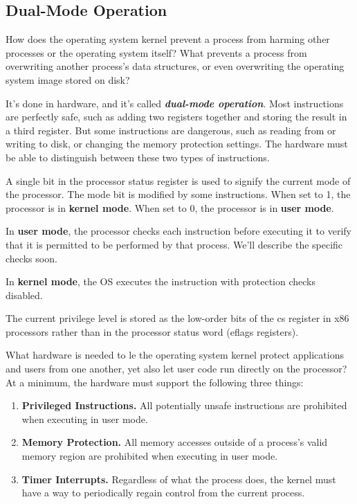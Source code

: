 \documentclass{article}
\begin{document}
\subsection{Dual-Mode Operation}
How does the operating system kernel prevent a process from harming other processes or the operating system itself? What prevents a process from overwriting another process's data structures, or even overwriting the operating system image stored on disk?

It's done in hardware, and it's called \textbf{\textit{dual-mode operation}}. Most instructions are perfectly safe, such as adding two registers together and storing the result in a third register. But some instructions are dangerous, such as reading from or writing to disk, or changing the memory protection settings. The hardware must be able to distinguish between these two types of instructions.

\begin{definition}
    A single bit in the processor status register is used to signify the current mode of the processor. The mode bit is modified by some instructions. When set to 1, the processor is in \textbf{kernel mode}. When set to 0, the processor is in \textbf{user mode}.

    In \textbf{user mode}, the processor checks each instruction before executing it to verify that it is permitted to be performed by that process. We'll describe the specific checks soon.

    In \textbf{kernel mode}, the OS executes the instruction with protection checks disabled.

    The current privilege level is stored as the low-order bits of the cs register in x86 processors rather than in the processor status word (eflags registers).
\end{definition}
What hardware is needed to le the operating system kernel protect applications and users from one another, yet also let user code run directly on the processor? At a minimum, the hardware must support the following three things:

\begin{enumerate}
    \item \textbf{Privileged Instructions.} All potentially unsafe instructions are prohibited when executing in user mode.
    \item \textbf{Memory Protection.} All memory accesses outside of a process's valid memory region are prohibited when executing in user mode.
    \item \textbf{Timer Interrupts.} Regardless of what the process does, the kernel must have a way to periodically regain control from the current process.
\end{enumerate}
\end{document}

